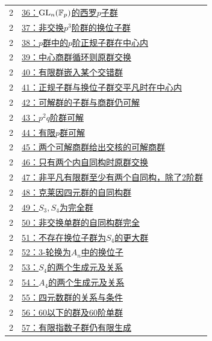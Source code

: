 \documentclass[UTF8,a4paper,11pt,fontset=windows]{ctexart}
\DeclareMathOperator{\GL}{GL}\DeclareMathOperator{\SL}{SL}
\begin{document}
\begin{longtable}{cp{13.5cm}}
2 & \hyperref[ex:2:36]{36：$\GL_n(\F_p)$的西罗$p$子群}\\

2 & \hyperref[ex:2:37]{37：非交换$p^3$阶群的换位子群}\\

2 & \hyperref[ex:2:38]{38：$p$群中的$p$阶正规子群在中心内}\\

2 & \hyperref[ex:2:39]{39：中心商群循环则原群交换}\\

2 & \hyperref[ex:2:40]{40：有限群嵌入某个交错群}\\

2 & \hyperref[ex:2:41]{41：正规子群与换位子群交平凡时在中心内}\\

2 & \hyperref[ex:2:42]{42：可解群的子群与商群仍可解}\\

2 & \hyperref[ex:2:43]{43：$p^2q$阶群可解}\\

2 & \hyperref[ex:2:44]{44：有限$p$群可解}\\

2 & \hyperref[ex:2:45]{45：两个可解商群给出交核的可解商群}\\

2 & \hyperref[ex:2:46]{46：只有两个内自同构时原群交换}\\

2 & \hyperref[ex:2:47]{47：非平凡有限群至少有两个自同构，除了2阶群}\\

2 & \hyperref[ex:2:48]{48：克莱因四元群的自同构群}\\

2 & \hyperref[ex:2:49]{49：$S_3,S_4$为完全群}\\

2 & \hyperref[ex:2:50]{50：非交换单群的自同构群完全}\\

2 & \hyperref[ex:2:51]{51：不存在换位子群为$S_4$的更大群}\\

2 & \hyperref[ex:2:52]{52：3-轮换为$A_n$中的换位子}\\

2 & \hyperref[ex:2:53]{53：$S_4$的两个生成元及关系}\\

2 & \hyperref[ex:2:54]{54：$A_4$的两个生成元及关系}\\

2 & \hyperref[ex:2:55]{55：四元数群的关系与条件}\\

2 & \hyperref[ex:2:56]{56：60以下的群及60阶单群}\\

2 & \hyperref[ex:2:57]{57：有限指数子群仍有限生成}\\

\bottomrule\end{longtable}
\end{document}
